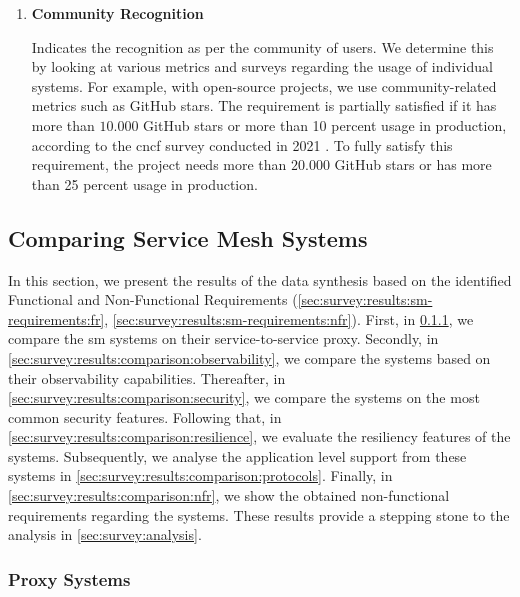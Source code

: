 \begin{enumerate}[label=\textbf{NFR\arabic*}, leftmargin=3\parindent]
    \item \textbf{Community Recognition}
    \label{nfr-5}
    
    Indicates the recognition as per the community of users. We determine this by looking at various metrics and surveys regarding the usage of individual systems. For example, with open-source projects, we use community-related metrics such as GitHub stars. The requirement is partially satisfied if it has more than $10.000$ GitHub stars or more than 10 percent usage in production, according to the \gls{cncf} survey conducted in 2021 \cite{cncf-survey-2021}. To fully satisfy this requirement, the project needs more than $20.000$ GitHub stars or has more than 25 percent usage in production. 
\end{enumerate}



\subsection{Comparing Service Mesh Systems}
\label{sec:survey:results:comparison}

In this section, we present the results of the data synthesis based on the identified Functional and Non-Functional Requirements (\cref{sec:survey:results:sm-requirements:fr}, \cref{sec:survey:results:sm-requirements:nfr}). First, in \cref{sec:survey:results:comparison:proxy}, we compare the \gls{sm} systems on their service-to-service proxy. Secondly, in \cref{sec:survey:results:comparison:observability}, we compare the systems based on their observability capabilities. Thereafter, in \cref{sec:survey:results:comparison:security}, we compare the systems on the most common security features. Following that, in \cref{sec:survey:results:comparison:resilience}, we evaluate the resiliency features of the systems. Subsequently, we analyse the application level support from these systems in \cref{sec:survey:results:comparison:protocols}. Finally, in \cref{sec:survey:results:comparison:nfr}, we show the obtained non-functional requirements regarding the systems. These results provide a stepping stone to the analysis in \cref{sec:survey:analysis}.

\subsubsection{Proxy Systems}
\label{sec:survey:results:comparison:proxy}



